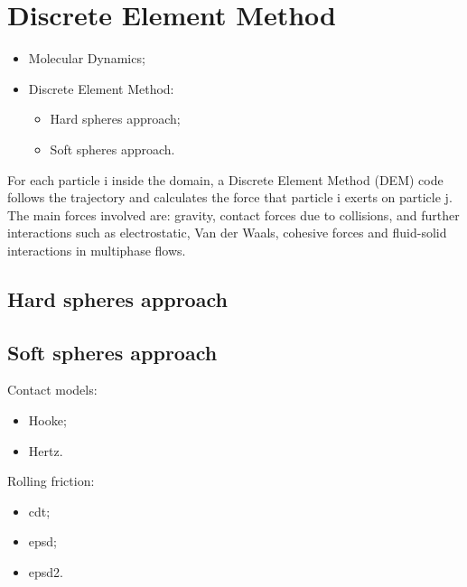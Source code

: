 
\chapter{Discrete Element Method}
\label{cap:dem}


\begin{itemize}
  \item{Molecular Dynamics;}
  \item{Discrete Element Method:
  \begin{itemize}
  \item{Hard spheres approach;}
  \item{Soft spheres approach.}
\end{itemize} }
\end{itemize}

For each particle i inside the domain, a Discrete Element Method (\acs{DEM}) code
follows the trajectory and calculates the force that particle i exerts on particle j.
The main forces involved are: gravity, contact forces due to collisions, and
further interactions such as electrostatic, Van der Waals, cohesive forces and fluid-solid interactions in 
multiphase flows. 

\section{Hard spheres approach}
\label{sec:hardspheresapproach}

\section{Soft spheres approach}
\label{sec:softspheresapproach}

Contact models:
\begin{itemize}
  \item{Hooke;}
  \item{Hertz.}
\end{itemize}
Rolling friction:
\begin{itemize}
  \item{cdt;}
  \item{epsd;}
  \item{epsd2.}
\end{itemize}

